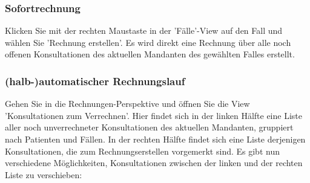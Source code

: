 \documentclass[a4paper]{scrartcl}
\begin{document}
\subsubsection{Sofortrechnung}
Klicken Sie mit der rechten Maustaste in der 'Fälle'-View auf den Fall und wählen Sie 'Rechnung erstellen'. Es wird direkt eine Rechnung über alle noch offenen Konsultationen des aktuellen Mandanten des gewählten Falles erstellt.

\subsubsection{(halb-)automatischer Rechnungslauf}
Gehen Sie in die Rechnungen-Perspektive und öffnen Sie die View 'Konsultationen zum Verrechnen'. Hier findet sich in der linken Hälfte eine Liste aller noch unverrechneter Konsultationen des aktuellen Mandanten, gruppiert nach Patienten und Fällen. In der rechten Hälfte findet sich eine Liste derjenigen Konsultationen, die zum Rechnungserstellen vorgemerkt sind. Es gibt nun verschiedene Möglichkeiten, Konsultationen zwischen der linken und der rechten Liste zu verschieben:
\end{document}
